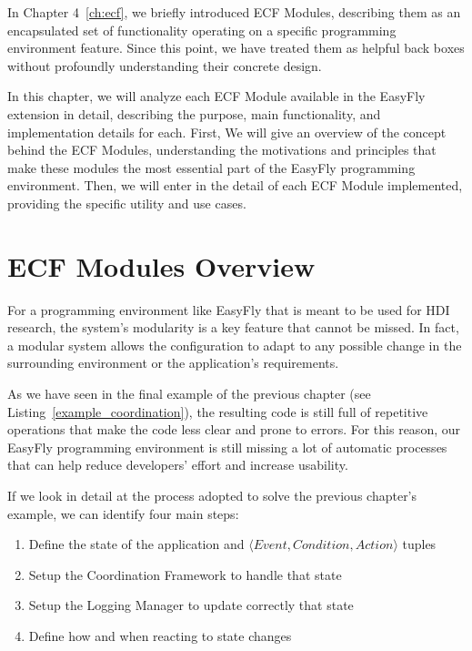 In Chapter 4~\ref{ch:ecf}, we briefly introduced ECF Modules, describing them as an encapsulated set of functionality operating on a specific programming environment feature.
Since this point, we have treated them as helpful back boxes without profoundly understanding their concrete design.

In this chapter, we will analyze each ECF Module available in the EasyFly extension in detail, describing the purpose, main functionality, and implementation details for each. 
First, We will give an overview of the concept behind the ECF Modules, understanding the motivations and principles that make these modules the most essential part of the EasyFly programming environment.
Then, we will enter in the detail of each ECF Module implemented, providing the specific utility and use cases.

\section{ECF Modules Overview}\label{sec:modules_overview}
For a programming environment like EasyFly that is meant to be used for HDI research, the system's modularity is a key feature that cannot be missed.
In fact, a modular system allows the configuration to adapt to any possible change in the surrounding environment or the application's requirements.

As we have seen in the final example of the previous chapter (see Listing~\ref{example_coordination}), the resulting code is still full of repetitive operations that make the code less clear and prone to errors.
For this reason, our EasyFly programming environment is still missing a lot of automatic processes that can help reduce developers' effort and increase usability. 

\pagebreak%

If we look in detail at the process adopted to solve the previous chapter's example, we can identify four main steps:
\begin{enumerate}
    \item Define the state of the application and \( \langle Event, Condition, Action \rangle \) tuples
    \item Setup the Coordination Framework to handle that state
    \item Setup the Logging Manager to update correctly that state
    \item Define how and when reacting to state changes
\end{enumerate}

